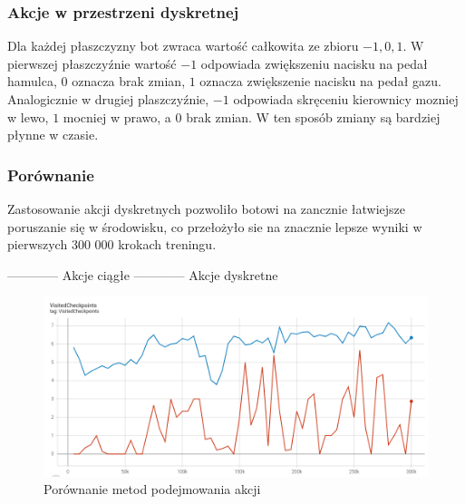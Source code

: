 \subsubsection{Akcje w przestrzeni dyskretnej}
Dla każdej płaszczyzny bot zwraca wartość całkowita ze zbioru ${-1, 0, 1}$. W pierwszej płaszczyźnie wartość $-1$ odpowiada zwiększeniu nacisku na pedał hamulca, $0$ oznacza brak zmian, $1$ oznacza zwiększenie nacisku na pedał gazu. Analogicznie w drugiej plaszczyźnie, $-1$ odpowiada skręceniu kierownicy mozniej w lewo, $1$ mocniej w prawo, a $0$ brak zmian. W ten sposób zmiany są bardziej płynne w czasie.

\subsubsection{Porównanie}
Zastosowanie akcji dyskretnych pozwoliło botowi na zancznie łatwiejsze poruszanie się w środowisku, co przełożyło sie na znacznie lepsze wyniki w pierwszych 300 000 krokach treningu.
\begin{center}
    \color[HTML]{CC3311} ------------ \color{black} Akcje ciągłe \hspace{1cm} \color[HTML]{0077BB} ------------ \color{black} Akcje dyskretne
\end{center}
\begin{figure}[H]
    \centering
    \includegraphics[width=.5\textwidth]{figures/output_values_compare}
    \caption{Porównanie metod podejmowania akcji}
    \label{fig}
\end{figure}

